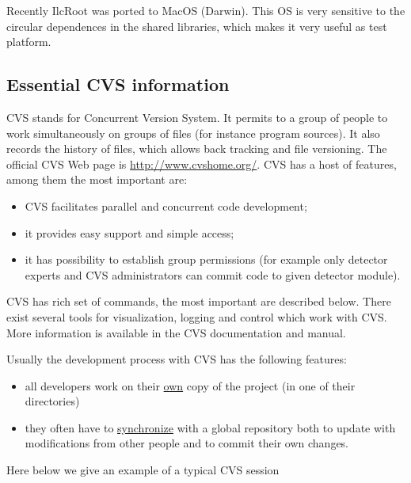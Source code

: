 \documentclass[12pt,a4paper,twoside]{article}
\begin{document}
Recently  IlcRoot  was ported  to  MacOS  (Darwin).  This OS  is  very
sensitive to  the circular dependences in the  shared libraries, which
makes it very useful as test platform.


\subsection{Essential CVS information}

CVS\cite{CVS} stands  for Concurrent Version  System. It permits  to a
group  of  people to  work  simultaneously  on  groups of  files  (for
instance program sources). It also records the history of files, which
allows back tracking and file versioning. The official CVS Web page is
\url{http://www.cvshome.org/}. CVS has a  host of features, among them
the most important are:
\begin{itemize} 
\item CVS facilitates parallel and concurrent code development;
\item it provides easy support and simple access;
\item it has possibility to establish group permissions (for example
  only detector experts and CVS administrators can commit code to
  given detector module).
\end{itemize}
CVS has rich set of  commands, the most important are described below.
There exist several tools for visualization, logging and control which
work with CVS. More information  is available in the CVS documentation
and manual\cite{CVSManual}.

Usually the development process with CVS has the following features:
\begin{itemize}
\item all developers work on their \underline{own} copy of the project
  (in one of their directories)
\item they often have to \underline{synchronize} with a global
  repository both to update with modifications from other people and
  to commit their own changes.
\end{itemize}

Here below we give an example of a typical CVS session
\end{document}
